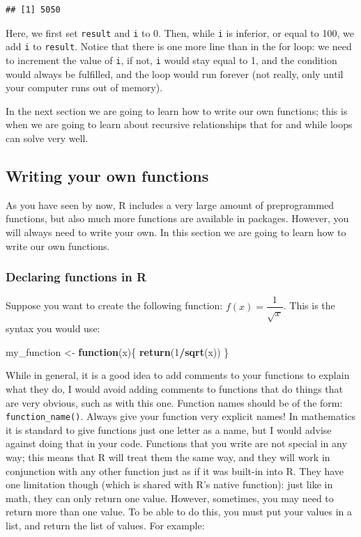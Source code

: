 \documentclass[]{gitbook}
\newenvironment{Shaded}{\begin{snugshade}}{\end{snugshade}}
\newcommand{\ControlFlowTok}[1]{\textcolor[rgb]{0.13,0.29,0.53}{\textbf{#1}}}
\newcommand{\DecValTok}[1]{\textcolor[rgb]{0.00,0.00,0.81}{#1}}
\newcommand{\KeywordTok}[1]{\textcolor[rgb]{0.13,0.29,0.53}{\textbf{#1}}}
\newcommand{\NormalTok}[1]{#1}
\newcommand{\OperatorTok}[1]{\textcolor[rgb]{0.81,0.36,0.00}{\textbf{#1}}}
\newcommand{\StringTok}[1]{\textcolor[rgb]{0.31,0.60,0.02}{#1}}
\begin{document}
\begin{verbatim}
## [1] 5050
\end{verbatim}

Here, we first set \texttt{result} and \texttt{i} to 0. Then, while \texttt{i} is inferior, or equal to 100, we add \texttt{i}
to \texttt{result}. Notice that there is one more line than in the for loop: we need to increment the value
of \texttt{i}, if not, \texttt{i} would stay equal to 1, and the condition would always be fulfilled, and
the loop would run forever (not really, only until your computer runs out of memory).

In the next section we are going to learn how to write our own functions; this is when we are going
to learn about recursive relationships that for and while loops can solve very well.

\hypertarget{writing-your-own-functions}{%
\subsection{Writing your own functions}\label{writing-your-own-functions}}

As you have seen by now, R includes a very large amount of preprogrammed functions, but also much
more functions are available in packages. However, you will always need to write your own. In this
section we are going to learn how to write our own functions.

\hypertarget{declaring-functions-in-r}{%
\subsubsection{Declaring functions in R}\label{declaring-functions-in-r}}

Suppose you want to create the following function: \(f(x) = \dfrac{1}{\sqrt{x}}\).
This is the syntax you would use:

\begin{Shaded}
\begin{Highlighting}[]
\NormalTok{my_function <-}\StringTok{ }\ControlFlowTok{function}\NormalTok{(x)\{}
\KeywordTok{return}\NormalTok{(}\DecValTok{1}\OperatorTok{/}\KeywordTok{sqrt}\NormalTok{(x))}
\NormalTok{\}}
\end{Highlighting}
\end{Shaded}

While in general, it is a good idea to add comments to your functions to explain what they do, I
would avoid adding comments to functions that do things that are very obvious, such as with this
one. Function names should be of the form: \texttt{function\_name()}. Always give your function very
explicit names! In mathematics it is standard to give functions just one letter as a name, but I
would advise against doing that in your code. Functions that you write are not special in any way;
this means that R will treat them the same way, and they will work in conjunction with any other
function just as if it was built-in into R. They have one limitation though (which is shared with
R's native function): just like in math, they can only return one value. However, sometimes, you
may need to return more than one value. To be able to do this, you must put your values in a list,
and return the list of values. For example:
\end{document}

